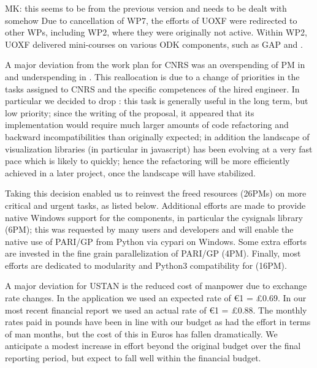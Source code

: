 \begin{oldpart}{MK: this seems to be from the previous version and needs to be dealt with somehow}
Due to cancellation of WP7, the efforts of UOXF were redirected to other WPs, including
WP2, where they were originally not active. Within WP2, UOXF delivered mini-courses on various ODK components,
such as GAP and \Sage.

A major deviation from the work plan for CNRS was an overspending of
PM in  and underspending in . This reallocation
is due to a change of priorities in the tasks assigned to CNRS and the
specific competences of the hired engineer. In particular we decided
to drop : this task is generally useful in
the long term, but low priority; since the writing of the proposal, it
appeared that its implementation would require much larger amounts of
code refactoring and backward incompatibilities than originally
expected; in addition the landscape of visualization libraries (in
particular in javascript) has been evolving at a very fast pace which
is likely to quickly; hence the refactoring will be more efficiently
achieved in a later project, once the landscape will have stabilized.

Taking this decision enabled us to reinvest the freed resources
(26PMs) on more critical and urgent tasks, as listed below. Additional
efforts are made to provide native Windows support for the \ODK
components, in particular the cysignals library (6PM); this was
requested by many users and developers and will enable the native use
of PARI/GP from Python via cypari on Windows. Some extra efforts are
invested in the fine grain parallelization of PARI/GP (4PM). Finally,
most efforts are dedicated to modularity and Python3 compatibility for
\Sage (16PM).


A major deviation for USTAN is the reduced cost of manpower due to exchange rate changes. In the application
we used an expected rate of \euro 1 = \pounds 0.69. In our most recent financial report we used an actual
rate of \euro 1 = \pounds 0.88. The monthly rates paid in pounds have been in line with our budget as had the 
effort in terms of man months, but the cost of this in Euros has fallen dramatically. We anticipate a modest increase in 
effort beyond the original budget over the final reporting period, but expect to fall well within the financial budget.


\end{oldpart}
